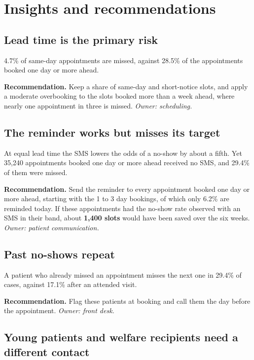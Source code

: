\documentclass[12pt,a4paper]{article}
\begin{document}
\section{Insights and recommendations}\label{sec:insights}

\subsection{Lead time is the primary risk}

4.7\% of same-day appointments are missed, against 28.5\% of the appointments booked one
day or more ahead.

\textbf{Recommendation.} Keep a share of same-day and short-notice slots, and apply a
moderate overbooking to the slots booked more than a week ahead, where nearly one
appointment in three is missed. \emph{Owner: scheduling.}

\subsection{The reminder works but misses its target}

At equal lead time the SMS lowers the odds of a no-show by about a fifth. Yet 35{,}240
appointments booked one day or more ahead received no SMS, and 29.4\% of them were missed.

\textbf{Recommendation.} Send the reminder to every appointment booked one day or more
ahead, starting with the 1 to 3 day bookings, of which only 6.2\% are reminded today. If
these appointments had the no-show rate observed with an SMS in their band, about
\textbf{1{,}400 slots} would have been saved over the six weeks. \emph{Owner: patient
communication.}

\subsection{Past no-shows repeat}

A patient who already missed an appointment misses the next one in 29.4\% of cases,
against 17.1\% after an attended visit.

\textbf{Recommendation.} Flag these patients at booking and call them the day before the
appointment. \emph{Owner: front desk.}

\subsection{Young patients and welfare recipients need a different contact}
\end{document}
